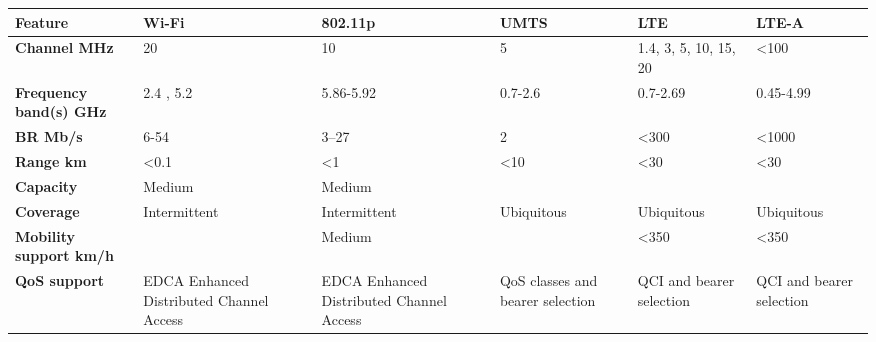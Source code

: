 \begin{table}[h!]
\scriptsize
	\begin{tabulary}{\textwidth}{L|L|L|L|L|L}
	\bf{Feature}                     & \bf{Wi-Fi}                                            & \bf{802.11p}                                          & \bf{UMTS}                        & \textbf{LTE}                      & \textbf{LTE-A}  \\\hline
	\bf{Channel MHz}           & 20                                                    & 10                                                    & 5                                & 1.4, 3, 5, 10, 15, 20    & <100                 \\\hline
	\bf{Frequency band(s) GHz}       & 2.4 , 5.2                                             & 5.86-5.92                                             & 0.7-2.6                          & 0.7-2.69                 & 0.45-4.99                 \\\hline
	\bf{\ac{BR} Mb/s}               & 6-54                                                  & 3–27                                                  & 2                                & <300                & <1000                \\\hline
	\bf{Range km}                    & <0.1                                                  & <1                                               & <10                         & <30                 & <30                  \\\hline
	\bf{Capacity}                    & Medium                                                & Medium                                                & \ko                              & \ok                      & \ok                       \\\hline
	\bf{Coverage}                    & Intermittent                                          & Intermittent                                          & Ubiquitous                       & Ubiquitous               & Ubiquitous                \\\hline
	\bf{Mobility support km/h}       & \ko                                                   & Medium                                                & \ok                              & <350                & <350                 \\\hline
	\bf{QoS support}                 & EDCA \scriptsize{Enhanced Distributed Channel Access} & EDCA \scriptsize{Enhanced Distributed Channel Access} & QoS classes and bearer selection & QCI and bearer selection & QCI and bearer selection  \\\hline

\end{tabulary}
\end{table}
